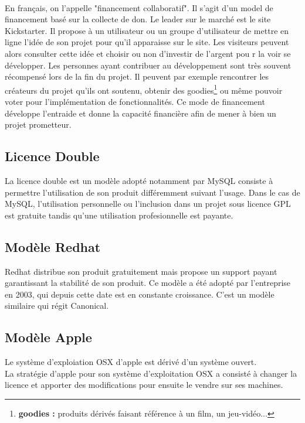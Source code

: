 \paragraph{} En français, on l'appelle "financement collaboratif". Il s'agit
d'un model de financement basé sur la collecte de don. Le leader sur le marché
est le site Kickstarter. Il propose à un utilisateur ou un groupe d'utilisateur
de mettre en ligne l'idée de son projet pour qu'il apparaisse sur le site. Les
visiteurs peuvent alors consulter cette idée et choisir ou non d'investir de
l'argent pou r la voir se développer. Les personnes ayant contribuer au
développement sont très souvent récompensé lors de la fin du projet. Il peuvent
par exemple rencontrer les créateurs du projet qu'ils ont soutenu, obtenir des
goodies\footnote{\textbf{goodies :} produits dérivés faisant référence à un
film, un jeu-vidéo...} ou même pouvoir voter pour l'implémentation de
fonctionnalités.  Ce mode de financement développe l'entraide et donne la
capacité financière afin de mener à bien un projet prometteur.

    \subsection{Licence Double}

La licence double est un modèle adopté notamment par MySQL consiste à permettre
l'utilisation de son produit différemment suivant l'usage. Dans le cas de
MySQL, l'utilisation personnelle ou l'inclusion dans un projet sous licence GPL
est gratuite tandis qu'une utilisation profesionnelle est payante.

    \subsection{Modèle Redhat}

Redhat distribue son produit gratuitement mais propose un support payant
garantissant la stabilité de son produit. Ce modèle a été adopté par
l'entreprise en 2003, qui depuis cette date est en constante croissance.  C'est
un modèle similaire qui régit Canonical.

    \subsection{Modèle Apple}

Le système d'exploiation OSX d'apple est dérivé d'un système ouvert.\\ La
stratégie d'apple pour son système d'exploitation OSX a consisté à changer la
licence et apporter des modifications pour ensuite le vendre sur ses machines.

